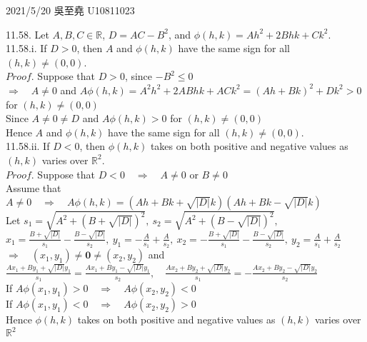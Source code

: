 \documentclass[12pt]{book}
\author{andersonwu2000}
\begin{document}
\begin{CJK}{UTF8}{bsmi}

\hfill 2021/5/20 吳至堯 U10811023

11.58. Let $A, B, C\in\mathbb{R}$, $D=AC-B^2$, and $\phi(h, k)=Ah^2+2Bhk+Ck^2$. \\

11.58.i. If $D>0$, then $A$ and $\phi(h, k)$ have the same sign for all $(h, k)\ne(0, 0)$. \\
$Proof$. Suppose that $D>0$, since $-B^2\le0$ \\
$\Rightarrow\quad A\ne0$ and $A\phi(h, k)=A^2h^2+2ABhk+ACk^2=(Ah+Bk)^2+Dk^2>0$ for $(h, k)\ne(0, 0)$ \\
Since $A\ne0\ne D$ and $A\phi(h, k)>0$ for $(h, k)\ne(0, 0)$ \\
Hence $A$ and $\phi(h, k)$ have the same sign for all $(h, k)\ne(0, 0)$. \\

11.58.ii. If $D<0$, then $\phi(h, k)$ takes on both positive and negative values as $(h, k)$ varies over $\mathbb{R}^2$. \\
$Proof$. Suppose that $D<0\quad\Rightarrow\quad A\ne0$ or $B\ne0$ \\
Assume that $A\ne0\quad\Rightarrow\quad A\phi(h, k)=(Ah+Bk+\sqrt{|D|}k)(Ah+Bk-\sqrt{|D|}k)$ \\[5pt]
Let $\displaystyle s_1=\sqrt{A^2+(B+\sqrt{|D|})^2},\ s_2=\sqrt{A^2+(B-\sqrt{|D|})^2}, $ \\[5pt]
\hspace*{2em}$\displaystyle 
x_1=\frac{B+\sqrt{|D|}}{s_1}-\frac{B-\sqrt{|D|}}{s_2},\ y_1=-\frac{A}{s_1}+\frac{A}{s_2},\ x_2=-\frac{B+\sqrt{|D|}}{s_1}-\frac{B-\sqrt{|D|}}{s_2},\ y_2=\frac{A}{s_1}+\frac{A}{s_2}$ \\[5pt]
$\displaystyle\Rightarrow\quad(x_1, y_1)\ne\mathbf{0}\ne(x_2, y_2)$ and \\[5pt]
\hspace*{2em}$\displaystyle\frac{Ax_1+By_1+\sqrt{|D|}y_1}{s_1}=\frac{Ax_1+By_1-\sqrt{|D|}y_1}{s_2},\quad\displaystyle\frac{Ax_2+By_2+\sqrt{|D|}y_2}{s_1}=-\frac{Ax_2+By_2-\sqrt{|D|}y_2}{s_2}$\\[5pt]
If $A\phi(x_1, y_1)>0\quad\Rightarrow\quad A\phi(x_2, y_2)<0$ \\
If $A\phi(x_1, y_1)<0\quad\Rightarrow\quad A\phi(x_2, y_2)>0$ \\
Hence $\phi(h, k)$ takes on both positive and negative values as $(h, k)$ varies over $\mathbb{R}^2$ \\


\end{CJK}
\end{document}
